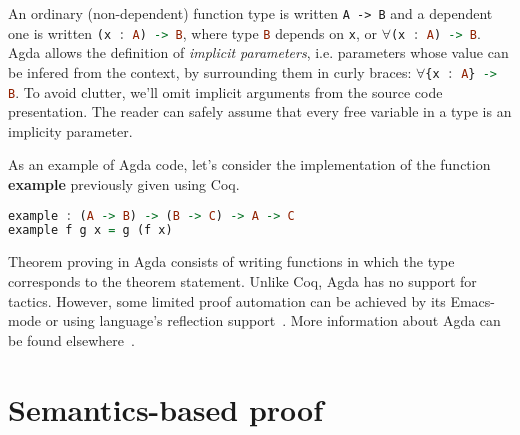 An ordinary (non-dependent) function type is written \lstinline|A -> B| and a
dependent one is written \lstinline[language=haskell]|(x : A) -> B|, where type \lstinline[language=haskell]|B| depends on
\lstinline[language=haskell]|x|, or $\forall$\lstinline[language=haskell]|(x : A) -> B|. Agda allows the definition of \emph{implicit
parameters}, i.e.  parameters whose value can be infered from the
context, by surrounding them in curly braces: $\forall$\lstinline[language=haskell]|{x : A} -> B|. To
avoid clutter, we'll omit implicit arguments from the source code
presentation. The reader can safely assume that every free variable in
a type is an implicity parameter.


As an example of Agda code, let's consider the implementation of the function \textbf{example}
previously given using Coq.



\begin{lstlisting}[language=haskell]
example : (A -> B) -> (B -> C) -> A -> C
example f g x = g (f x) 
\end{lstlisting}



Theorem proving in Agda consists of writing functions in which the type corresponds to the
theorem statement. Unlike Coq, Agda has no support for tactics. However, some limited proof
automation can be achieved by its Emacs-mode or using language's reflection support~\cite{Kokke15}.
More information about Agda can be found elsewhere~\cite{plfa2019}.


\section{Semantics-based proof}\label{sec:semantics}


